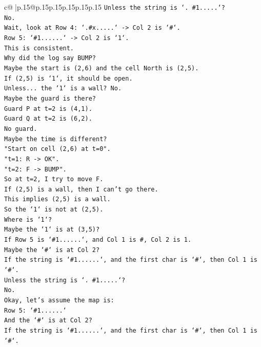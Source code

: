 \documentclass{article}
\begin{document}
{\begin{supertabular}{c@{$\;$}|p{.15\linewidth}@{}p{.15\linewidth}p{.15\linewidth}p{.15\linewidth}p{.15\linewidth}p{.15\linewidth}}
{{{\texttt{Unless the string is `. \#1.....`?} \\
\texttt{No.} \\
\texttt{Wait, look at Row 4: `.\#x.....` {-}> Col 2 is `\#`.} \\
\texttt{Row 5: `\#1......` {-}> Col 2 is `1`.} \\
\texttt{This is consistent.} \\
\texttt{Why did the log say BUMP?} \\
\texttt{Maybe the start is (2,6) and the cell North is (2,5).} \\
\texttt{If (2,5) is `1`, it should be open.} \\
\texttt{Unless... the `1` is a wall? No.} \\
\texttt{Maybe the guard is there?} \\
\texttt{Guard P at t=2 is (4,1).} \\
\texttt{Guard Q at t=2 is (6,2).} \\
\texttt{No guard.} \\
\texttt{Maybe the time is different?} \\
\texttt{"Start on cell (2,6) at t=0".} \\
\texttt{"t=1: R {-}> OK".} \\
\texttt{"t=2: F {-}> BUMP".} \\
\texttt{So at t=2, I try to move F.} \\
\texttt{If (2,5) is a wall, then I can't go there.} \\
\texttt{This implies (2,5) is a wall.} \\
\texttt{So the `1` is not at (2,5).} \\
\texttt{Where is `1`?} \\
\texttt{Maybe the `1` is at (3,5)?} \\
\texttt{If Row 5 is `\#1......`, and Col 1 is \#, Col 2 is 1.} \\
\texttt{Maybe the `\#` is at Col 2?} \\
\texttt{If the string is `\#1......`, and the first char is `\#`, then Col 1 is `\#`.} \\
\texttt{Unless the string is `. \#1.....`?} \\
\texttt{No.} \\
\texttt{Okay, let's assume the map is:} \\
\texttt{Row 5: `\#1......`} \\
\texttt{And the `\#` is at Col 2?} \\
\texttt{If the string is `\#1......`, and the first char is `\#`, then Col 1 is `\#`.} \\
}}}
\end{supertabular}}
\end{document}
